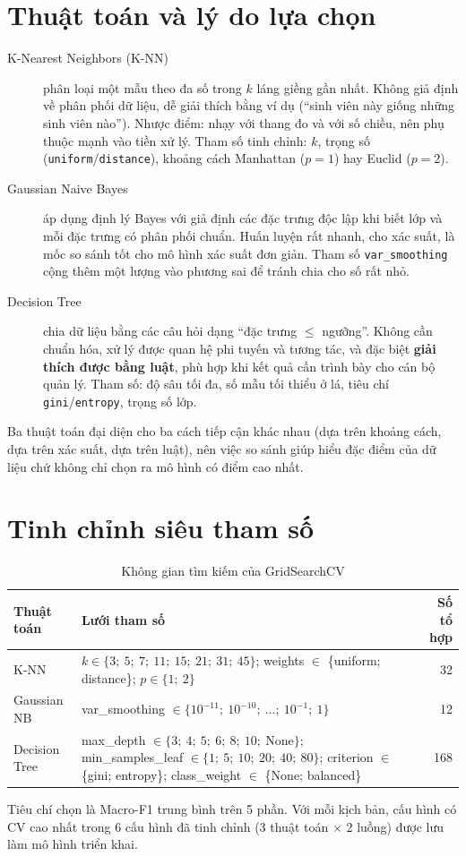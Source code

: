\documentclass[12pt,a4paper,oneside]{report}
\newcommand{\code}[1]{\texttt{#1}}
\newcommand{\fone}{Macro-F1}
\begin{document}
\section{Thuật toán và lý do lựa chọn}
\begin{description}
  \item[K-Nearest Neighbors (K-NN)] \cite{cover1967} phân loại một mẫu theo đa số trong $k$ láng giềng gần nhất.
        Không giả định về phân phối dữ liệu, dễ giải thích bằng ví dụ (``sinh viên này giống những sinh viên nào''). Nhược điểm:
        nhạy với thang đo và với số chiều, nên phụ thuộc mạnh vào tiền xử lý. Tham số tinh chỉnh: $k$, trọng số
        (\code{uniform}/\code{distance}), khoảng cách Manhattan ($p=1$) hay Euclid ($p=2$).
  \item[Gaussian Naive Bayes] áp dụng định lý Bayes với giả định các đặc trưng độc lập khi biết lớp và mỗi đặc trưng có phân phối chuẩn.
        Huấn luyện rất nhanh, cho xác suất, là mốc so sánh tốt cho mô hình xác suất đơn giản. Tham số \code{var\_smoothing}
        cộng thêm một lượng vào phương sai để tránh chia cho số rất nhỏ.
  \item[Decision Tree] \cite{breiman1984} chia dữ liệu bằng các câu hỏi dạng ``đặc trưng $\le$ ngưỡng''. Không cần chuẩn hóa,
        xử lý được quan hệ phi tuyến và tương tác, và đặc biệt \textbf{giải thích được bằng luật}, phù hợp khi kết quả cần trình bày cho
        cán bộ quản lý. Tham số: độ sâu tối đa, số mẫu tối thiểu ở lá, tiêu chí \code{gini}/\code{entropy}, trọng số lớp.
\end{description}
Ba thuật toán đại diện cho ba cách tiếp cận khác nhau (dựa trên khoảng cách, dựa trên xác suất, dựa trên luật), nên việc so
sánh giúp hiểu đặc điểm của dữ liệu chứ không chỉ chọn ra mô hình có điểm cao nhất.

\section{Tinh chỉnh siêu tham số}
\begin{table}[H]
\centering
\caption{Không gian tìm kiếm của GridSearchCV}\label{tab:grid}
\begin{tabularx}{\textwidth}{@{}lXr@{}}
\toprule
\textbf{Thuật toán} & \textbf{Lưới tham số} & \textbf{Số tổ hợp}\\
\midrule
K-NN & $k \in \{3;\ 5;\ 7;\ 11;\ 15;\ 21;\ 31;\ 45\}$; weights $\in$ \{uniform; distance\}; $p \in \{1;\ 2\}$ & 32\\
Gaussian NB & var\_smoothing $\in \{10^{-11};\ 10^{-10};\ \dots;\ 10^{-1};\ 1\}$ & 12\\
Decision Tree & max\_depth $\in \{3;\ 4;\ 5;\ 6;\ 8;\ 10;\ \text{None}\}$; min\_samples\_leaf $\in \{1;\ 5;\ 10;\ 20;\ 40;\ 80\}$; criterion $\in$ \{gini; entropy\}; class\_weight $\in$ \{None; balanced\} & 168\\
\bottomrule
\end{tabularx}
\end{table}
Tiêu chí chọn là \fone{} trung bình trên 5 phần. Với mỗi kịch bản, cấu hình có CV cao nhất trong 6 cấu hình đã tinh chỉnh
(3 thuật toán $\times$ 2 luồng) được lưu làm mô hình triển khai.
\end{document}
